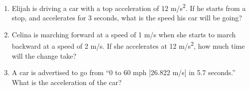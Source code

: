 \documentclass[letterpaper, 12pt]{article}
\begin{document}
\begin{enumerate}
\vspace{1in}
\item Elijah is driving a car with a top acceleration of 12 m/s\textsuperscript{2}.  If he starts from a stop, and accelerates for 3 seconds, what is the speed his car will be going?
\vspace{1in}
\item Celina is marching forward at a speed of 1 m/s when she starts to march backward at a speed of 2 m/s.  If she accelerates at 12 m/s\textsuperscript{2}, how much time will the change take?
\vspace{1in}
\item A car is advertised to go from “0 to 60 mph [26.822 m/s] in 5.7 seconds.”  What is the acceleration of the car?







	
\end{enumerate}
 
\end{document}
